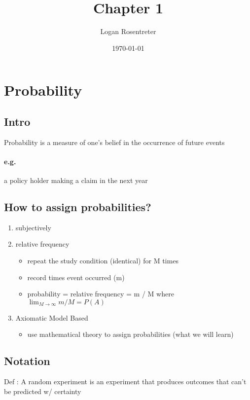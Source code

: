 

\title{Chapter 1}
\author{Logan Rosentreter}
\date{\today} %



\maketitle\thispagestyle{fancy}
\chapter*{Probability}
\section*{Intro}
Probability is a measure of one's belief in the occurrence of future events
\subsubsection*{e.g.}
a policy holder making a claim in the next year
\section*{How to assign probabilities?}
\begin{enumerate}
    \item subjectively
    \item relative frequency
	\begin{itemize}
	    \item repeat the study condition (identical) for M times
	    \item record times event occurred (m)
	    \item probability = relative frequency = m / M where $\lim_{M \to \infty} m / M = P(A)$
	\end{itemize}
    \item Axiomatic Model Based
	\begin{itemize}
	    \item use mathematical theory to assign probabilities (what we will learn)
	\end{itemize}
\end{enumerate}
\section*{Notation}

Def : A random experiment is an experiment that produces outcomes that can't be predicted w/ certainty

